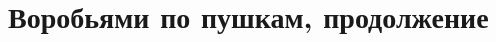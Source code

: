 

\section*{Воробьями по пушкам, продолжение}






\begingroup
\providecommand{\ifgroupten}{\iffalse}
\providecommand{\ifgroupeleven}{\iffalse}


\ifgroupten
\setproblem{10}
\fi

\ifgroupeleven
\setproblem{10}
\fi


